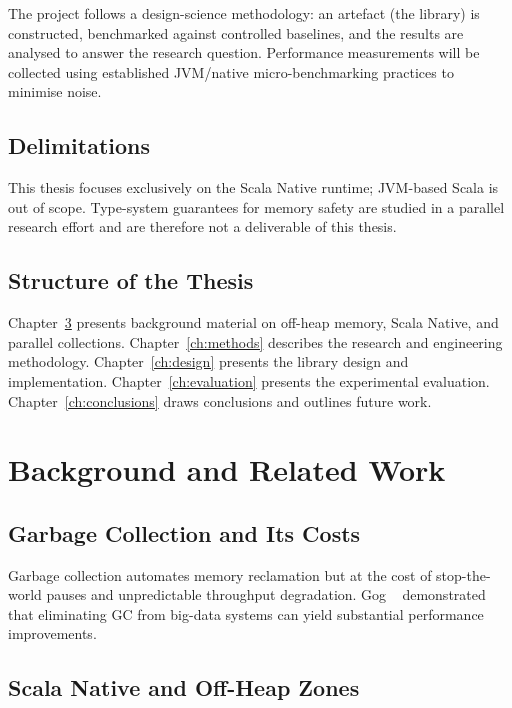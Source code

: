 \documentclass[
  english,   %
  bibtex,    %
]{kththesis}
\begin{document}
The project follows a design-science methodology: an artefact (the library)
is constructed, benchmarked against controlled baselines, and the results
are analysed to answer the research question.  Performance measurements
will be collected using established \gls{JVM}/native micro-benchmarking
practices to minimise noise.

\section{Delimitations}
\label{sec:delimitations}

This thesis focuses exclusively on the Scala Native runtime; \gls{JVM}-based
Scala is out of scope.  Type-system guarantees for memory safety are studied
in a parallel research effort and are therefore not a deliverable of this
thesis.

\section{Structure of the Thesis}
\label{sec:structure}

Chapter~\ref{ch:background} presents background material on off-heap memory,
Scala Native, and parallel collections.
Chapter~\ref{ch:methods} describes the research and engineering methodology.
Chapter~\ref{ch:design} presents the library design and implementation.
Chapter~\ref{ch:evaluation} presents the experimental evaluation.
Chapter~\ref{ch:conclusions} draws conclusions and outlines future work.

\chapter{Background and Related Work}
\label{ch:background}

\section{Garbage Collection and Its Costs}

Garbage collection automates memory reclamation but at the cost of stop-the-world
pauses and unpredictable throughput degradation.  Gog \etal~\cite{gog_broom_2015}
demonstrated that eliminating GC from big-data systems can yield substantial
performance improvements.

\section{Scala Native and Off-Heap Zones}
\end{document}
